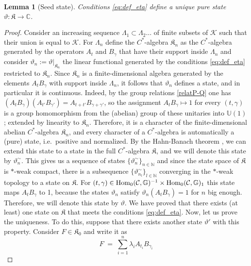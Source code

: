 \documentclass[a4paper,12pt,twoside,reqno]{amsart}
\theoremstyle{plain}
\newtheorem{lemma}[teo]{Lemma}
\theoremstyle{definition}
\theoremstyle{remark}
\numberwithin{equation}{section}
\numberwithin{figure}{section}
\numberwithin{table}{section}
\newcommand{\CC}{\mathbb{C}}
\newcommand{\NN}{\mathbb{N}}
\newcommand{\f}[1]{\mathcal{#1}}
\newcommand{\n}[1]{\mathbb{#1}}
\begin{document}
	\begin{lemma}[Seed state]\label{lemm:pur_st_K}
		Conditions \eqref{eq:def_eta} define a unique  pure state
		$\vartheta:\mathfrak{K}\to\CC$.
	\end{lemma}
	\begin{proof}
		
		
		
		
		Consider an increasing sequence $\Lambda_1\subset \Lambda_2\dots$ of finite subsets of $\f{K}$ such that their union is equal to $\f{K}$. For $\Lambda_n$ define the $C^*$-algebra $\mathfrak{K}_{n}$ as the $C^*$-algebra generated by the operators $A_t$ and $B_\gamma$ that have their support inside $\Lambda_n$ and consider $\vartheta_n:=\vartheta|_{\mathfrak{K}_n}$ the linear functional generated by the conditions 
		\eqref{eq:def_eta} restricted to $\mathfrak{K}_n$.
		Since $\mathfrak{K}_n$ is a finite-dimensional algebra generated by the elements  $A_tB_\gamma$ with support inside $\Lambda_n$, it follows that $\vartheta_n$ defines a state, and in particular it is continuous. Indeed, by the group relations \eqref{relatP-Q} one has $(A_tB_\gamma)(A_{t'}B_{\gamma'})=A_{t+t'}B_{\gamma+\gamma'}$, so the assignment $A_tB_\gamma\mapsto 1$ for every $(t,\gamma)$ is a group homomorphism from the (abelian) group of these unitaries into $\n{U}(1)$; extended by linearity to $\mathfrak{K}_n$. Therefore, it is a character of the finite-dimensional abelian $C^*$-algebra $\mathfrak{K}_n$, and every character of a $C^*$-algebra is automatically a (pure) state, i.e.\ positive and normalized.
		By the Hahn-Banach theorem \cite[Proposition 2.3.24]{Bratelli}, we can extend this state to a state in the full $C^*$-algebra $\mathfrak{K}$, and we will denote this state by $\vartheta_n^\sim$. This gives us a sequence of states $\{\vartheta_n^\sim\}_{n\in\NN}$ and since the state space of $\mathfrak{K}$ is $*$-weak compact, there is a subsequence $\{\vartheta_{n_l}^\sim\}_{l\in\NN}$ converging in the $\ast$-weak topology to a state on $\mathfrak{K}$. For $(t,\gamma)\in{\rm Hom}_0(\f{C},\n{G})^{-1}\times {\rm Hom}_0(\f{C},\n{G})_1$ this state maps $A_tB_\gamma$ to 1, because the states $\vartheta_n$ satisfy $\vartheta_n(A_tB_\gamma)=1$ for $n$ big enough. Therefore, we will denote this state by $\vartheta$. 
		We have proved that there exists (at least) one state on $\mathfrak{K}$ 
		that meets the conditions \eqref{eq:def_eta}. Now, let us prove the uniqueness. To do this, suppose that there exists another state $\vartheta'$ with this property. Consider $F\in\mathfrak{K}_0$ and write it as
		$$F\;=\;\sum_{i=1}^n \lambda_i A_{t_i}B_{\gamma_i}$$

\end{proof}
\end{document}
